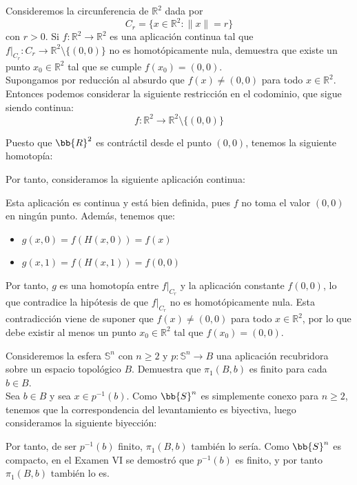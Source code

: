 \documentclass[12pt]{article}
\begin{document}
    \begin{ejercicio}
        Consideremos la circunferencia de $\mathbb{R}^2$ dada por
        \begin{equation*}
            C_r = \{x\in \mathbb{R}^2 : \|x\| = r\}
        \end{equation*}
        con $r>0$. Si $f:\mathbb{R}^2\to \mathbb{R}^2$ es una aplicación continua tal que $f\big|_{C_r}:C_r\to \mathbb{R}^2\setminus \{(0,0)\}$ no es homotópicamente nula, demuestra que existe un punto $x_0\in \mathbb{R}^2$ tal que se cumple $f(x_0) = (0,0)$.\\

        Supongamos por reducción al absurdo que $f(x) \neq (0,0)$ para todo $x \in \mathbb{R}^2$. Entonces podemos considerar la siguiente restricción en el codominio, que sigue siendo continua:
        \begin{equation*}
            f:\mathbb{R}^2 \to \mathbb{R}^2 \setminus \{(0,0)\}
        \end{equation*}

        Puesto que $\bb{R}^2$ es contráctil desde el punto $(0,0)$, tenemos la siguiente homotopía:

        Por tanto, consideramos la siguiente aplicación continua:

        Esta aplicación es continua y está bien definida, pues $f$ no toma el valor $(0,0)$ en ningún punto. Además, tenemos que:
        \begin{itemize}
            \item $g(x,0) = f(H(x,0)) = f(x)$
            \item $g(x,1) = f(H(x,1)) = f(0,0)$
        \end{itemize}

        Por tanto, $g$ es una homotopía entre $f\big|_{C_r}$ y la aplicación constante $f(0,0)$, lo que contradice la hipótesis de que $f\big|_{C_r}$ no es homotópicamente nula. Esta contradicción viene de suponer que $f(x) \neq (0,0)$ para todo $x \in \mathbb{R}^2$, por lo que debe existir al menos un punto $x_0 \in \mathbb{R}^2$ tal que $f(x_0) = (0,0)$.
    \end{ejercicio}

    \begin{ejercicio}
        Consideremos la esfera $\mathbb{S}^n$ con $n\geq 2$ y $p:\mathbb{S}^n\to B$ una aplicación recubridora sobre un espacio topológico $B$. Demuestra que $\pi_1(B,b)$ es finito para cada $b\in B$.\\

        Sea $b \in B$ y sea $x \in p^{-1}(b)$. Como $\bb{S}^n$ es simplemente conexo para $n \geq 2$, tenemos que la correspondencia del levantamiento es biyectiva, luego consideramos la siguiente biyección:

        Por tanto, de ser $p^{-1}(b)$ finito, $\pi_1(B,b)$ también lo sería. Como $\bb{S}^n$ es compacto, en el Examen VI se demostró que $p^{-1}(b)$ es finito, y por tanto $\pi_1(B,b)$ también lo es.
    \end{ejercicio}
\end{document}
